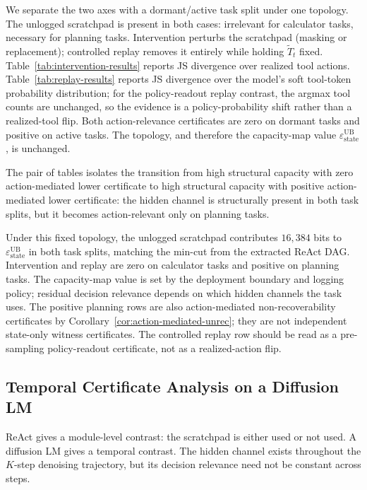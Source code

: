   We separate the two axes with a dormant/active task split under one topology.
  The unlogged scratchpad is present in both cases: irrelevant for calculator
  tasks, necessary for planning tasks. Intervention perturbs the scratchpad
  (masking or replacement); controlled replay removes it entirely while holding
  $\tilde T_t$ fixed. Table~\ref{tab:intervention-results} reports JS divergence
   over realized tool actions. Table~\ref{tab:replay-results} reports JS
  divergence over the model's soft tool-token probability distribution; for the
  policy-readout replay contrast, the argmax tool counts are unchanged, so the
  evidence is a policy-probability shift rather than a realized-tool flip. Both
  action-relevance certificates are zero on dormant tasks and positive on active
  tasks. The topology, and therefore the capacity-map value
  $\varepsilon_\text{state}^\text{UB}$, is unchanged.

  

  The pair of tables isolates the transition from high structural capacity with
  zero action-mediated lower certificate to high structural capacity with
  positive action-mediated lower certificate: the hidden channel is structurally
  present in both task splits, but it becomes action-relevant only on planning
  tasks.

  

  Under this fixed topology, the unlogged scratchpad contributes $16{,}384$ bits
   to $\varepsilon_\text{state}^\text{UB}$ in both task splits, matching the
  min-cut from the extracted ReAct DAG. Intervention and replay are zero on
  calculator tasks and positive on planning tasks. The capacity-map value is set
  by the deployment boundary and logging policy; residual decision relevance
  depends on which hidden channels the task uses. The positive planning rows are
  also action-mediated non-recoverability certificates by
  Corollary~\ref{cor:action-mediated-unrec}; they are not independent
  state-only witness certificates. The controlled replay row should be read as
  a pre-sampling policy-readout certificate, not as a realized-action flip.

  \subsection{Temporal Certificate Analysis on a Diffusion LM}
  \label{sec:diffusion-dynamic}

  ReAct gives a module-level contrast: the scratchpad is either used or not
  used. A diffusion LM gives a temporal contrast. The hidden channel exists
  throughout the $K$-step denoising trajectory, but its decision relevance need
  not be constant across steps.

